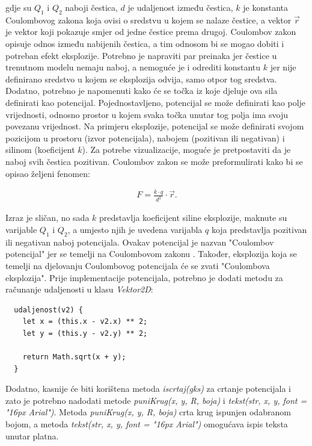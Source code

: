 \documentclass{foi}
\begin{document}
gdje su $Q_1$ i $Q_2$ naboji čestica, $d$ je udaljenost između čestica, $k$ je konstanta Coulombovog zakona koja ovisi o sredstvu u kojem se nalaze čestice, a vektor $\Vec{r}$ je vektor koji pokazuje smjer od jedne čestice prema drugoj. Coulombov zakon opisuje odnos između nabijenih čestica, a tim odnosom bi se mogao dobiti i potreban efekt eksplozije. Potrebno je napraviti par preinaka jer čestice u trenutnom modelu nemaju naboj, a nemoguće je i odrediti konstantu $k$ jer nije definirano sredstvo u kojem se eksplozija odvija, samo otpor tog sredstva. Dodatno, potrebno je napomenuti kako će se točka iz koje djeluje ova sila definirati kao potencijal. Pojednostavljeno, potencijal se može definirati kao polje vrijednosti, odnosno prostor u kojem svaka točka unutar tog polja ima svoju povezanu vrijednost. Na primjeru eksplozije, potencijal se može definirati svojom pozicijom u prostoru (izvor potencijala), nabojem (pozitivan ili negativan) i silinom (koeficijent $k$). Za potrebe vizualizacije, moguće je pretpostaviti da je naboj svih čestica pozitivan. Coulombov zakon se može preformulirati kako bi se opisao željeni fenomen:

 \begin{align*}
F = \frac{k\cdot q}{d^2}\cdot \Vec{r}.
\end{align*}

Izraz je sličan, no sada $k$ predstavlja koeficijent siline eksplozije, maknute su varijable $Q_1$ i $Q_2$, a umjesto njih je uvedena varijabla $q$ koja predstavlja pozitivan ili negativan naboj potencijala. Ovakav potencijal je nazvan "Coulombov potencijal" jer se temelji na Coulombovom zakonu \parencite{ByjusCoulombsLaw}. Također, eksplozija koja se temelji na djelovanju Coulombovog potencijala će se zvati "Coulombova eksplozija". Prije implementacije potencijala, potrebno je dodati metodu za računanje udaljenosti u klasu \textit{Vektor2D}:

\begin{verbatim}
  udaljenost(v2) {
    let x = (this.x - v2.x) ** 2;
    let y = (this.y - v2.y) ** 2;

    return Math.sqrt(x + y);
  }
\end{verbatim}

Dodatno, kasnije će biti korištena metoda \textit{iscrtaj(gks)} za crtanje potencijala i zato je potrebno nadodati metode \textit{puniKrug(x, y, R, boja)} i \textit{tekst(str, x, y, font = "16px Arial")}. Metoda \textit{puniKrug(x, y, R, boja)} crta krug ispunjen odabranom bojom, a metoda \textit{tekst(str, x, y, font = "16px Arial")} omogućava ispis teksta unutar platna.
\end{document}
